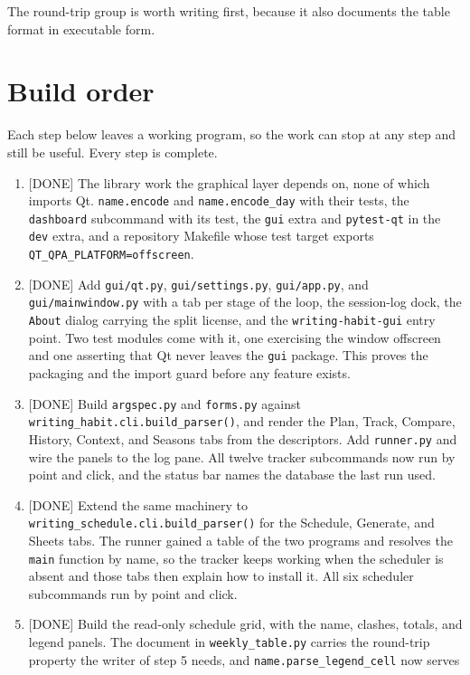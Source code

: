 \documentclass[11pt]{article}
\begin{document}
The round-trip group is worth writing first, because it also documents the
table format in executable form.
\section{Build order}
\label{sec:orgb858123}

Each step below leaves a working program, so the work can stop at any step and
still be useful. Every step is complete.

\begin{enumerate}
\item {[}DONE] The library work the graphical layer depends on, none of which imports
Qt. \texttt{name.encode} and \texttt{name.encode\_day} with their tests, the \texttt{dashboard}
subcommand with its test, the \texttt{gui} extra and \texttt{pytest-qt} in the \texttt{dev} extra,
and a repository Makefile whose test target exports
\texttt{QT\_QPA\_PLATFORM=offscreen}.
\item {[}DONE] Add \texttt{gui/qt.py}, \texttt{gui/settings.py}, \texttt{gui/app.py}, and
\texttt{gui/mainwindow.py} with a tab per stage of the loop, the session-log dock,
the \texttt{About} dialog carrying the split license, and the \texttt{writing-habit-gui}
entry point. Two test modules come with it, one exercising the window
offscreen and one asserting that Qt never leaves the \texttt{gui} package. This
proves the packaging and the import guard before any feature exists.
\item {[}DONE] Build \texttt{argspec.py} and \texttt{forms.py} against
\texttt{writing\_habit.cli.build\_parser()}, and render the Plan, Track, Compare,
History, Context, and Seasons tabs from the descriptors. Add \texttt{runner.py} and
wire the panels to the log pane. All twelve tracker subcommands now run by
point and click, and the status bar names the database the last run used.
\item {[}DONE] Extend the same machinery to \texttt{writing\_schedule.cli.build\_parser()} for
the Schedule, Generate, and Sheets tabs. The runner gained a table of the two
programs and resolves the \texttt{main} function by name, so the tracker keeps
working when the scheduler is absent and those tabs then explain how to
install it. All six scheduler subcommands run by point and click.
\item {[}DONE] Build the read-only schedule grid, with the name, clashes, totals, and
legend panels. The document in \texttt{weekly\_table.py} carries the round-trip
property the writer of step 5 needs, and \texttt{name.parse\_legend\_cell} now serves

\end{enumerate}
\end{document}
